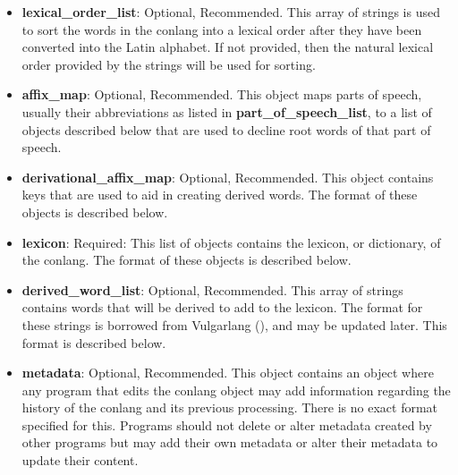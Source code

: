 \begin{itemize}
	\item \textbf{lexical\_order\_list}: Optional, Recommended. This array of strings is used to sort the words in the conlang into a lexical order after they have been converted into the Latin alphabet.  If not provided, then the natural lexical order provided by the strings will be used for sorting.
	\item \textbf{affix\_map}: Optional, Recommended. This object maps parts of speech, usually their abbreviations as listed in \textbf{part\_of\_speech\_list}, to a list of objects described below that are used to decline root words of that part of speech.
	\item \textbf{derivational\_affix\_map}: Optional, Recommended. This object contains keys that are used to aid in creating derived words.  The format of these objects is described below.
	\item \textbf{lexicon}: Required: This list of objects contains the lexicon, or dictionary, of the conlang.  The format of these objects is described below.
	\item \textbf{derived\_word\_list}: Optional, Recommended.  This array of strings contains words that will be derived to add to the lexicon.  The format for these strings is borrowed from Vulgarlang (\cite{camfromvulgarlangVulgarlangFantasyLanguage}), and may be updated later.  This format is described below.
	\item \textbf{metadata}: Optional, Recommended. This object contains an object where any program that edits the conlang object may add information regarding the history of the conlang and its previous processing.  There is no exact format specified for this.  Programs should not delete or alter metadata created by other programs but may add their own metadata or alter their metadata to update their content.  
\end{itemize}

